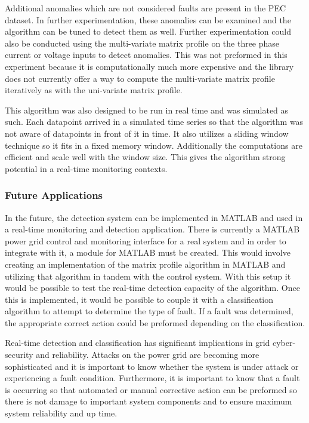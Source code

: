 Additional anomalies which are not considered faults are present in the PEC dataset. In further experimentation, these anomalies can be examined and the algorithm can be tuned to detect them as well. Further experimentation could also be conducted using the multi-variate matrix profile on the three phase current or voltage inputs to detect anomalies. This was not preformed in this experiment because it is computationally much more expensive and the library does not currently offer a way to compute the multi-variate matrix profile iteratively as with the uni-variate matrix profile.

This algorithm was also designed to be run in real time and was simulated as such. Each datapoint arrived in a simulated time series so that the algorithm was not aware of datapoints in front of it in time. It also utilizes a sliding window technique so it fits in a fixed memory window. Additionally the computations are efficient and scale well with the window size. This gives the algorithm strong potential in a real-time monitoring contexts.

\subsubsection{Future Applications}
In the future, the detection system can be implemented in MATLAB and used in a real-time monitoring and detection application. There is currently a MATLAB power grid control and monitoring interface for a real system and in order to integrate with it, a module for MATLAB must be created. This would involve creating an implementation of the matrix profile algorithm in MATLAB and utilizing that algorithm in tandem with the control system. With this setup it would be possible to test the real-time detection capacity of the algorithm. Once this is implemented, it would be possible to couple it with a classification algorithm to attempt to determine the type of fault. If a fault was determined, the appropriate correct action could be preformed depending on the classification. 

Real-time detection and classification has significant implications in grid cyber-security and reliability. Attacks on the power grid are becoming more sophisticated and it is important to know whether the system is under attack or experiencing a fault condition. Furthermore, it is important to know that a fault is occurring so that automated or manual corrective action can be preformed so there is not damage to important system components and to ensure maximum system reliability and up time.


